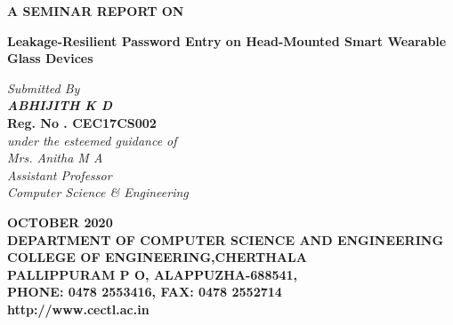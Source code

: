 \documentclass[12pt,a4paper,oneside]{report}
\begin{document}
\renewcommand\bibname{References}
\begin{titlepage}
\begin{center}
\Large{\textbf{A SEMINAR REPORT ON}}\\
\vspace{.2 in}
\begin{singlespace}
\LARGE{\textbf{Leakage-Resilient Password Entry on Head-Mounted Smart Wearable Glass Devices }}\\
\end{singlespace}
\vspace{.2 in}
\Large{\textit{Submitted By }}\\
\Large{\textit{\textbf{ABHIJITH K D}}} \\
\textbf{Reg. No . CEC17CS002}\\
\Large{\textit{\textit{under the esteemed guidance of}}}\\
\Large{\textit{Mrs. Anitha M A}}\\
\Large{\textit{Assistant Professor}}\\
\Large{\textit{Computer Science \& Engineering}}
\vspace{.05in}
\begin{figure}[h]
\begin{center}
\end{center}
\end{figure}
\begin{singlespace}
\large{\textbf{OCTOBER 2020}}\\
\vspace{.2in}
\large{\textbf{DEPARTMENT OF COMPUTER SCIENCE AND ENGINEERING\\COLLEGE OF ENGINEERING,CHERTHALA\\ PALLIPPURAM P O, ALAPPUZHA-688541, \\PHONE: 0478 2553416, FAX: 0478 2552714\\http://www.cectl.ac.in}}
\end{singlespace}
\end{center}
\end{titlepage}
\end{document}
